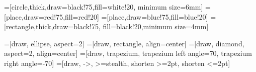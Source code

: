 \usepackage{ifthen}
\usepackage{mathtools} %
\usepackage[usenames,dvipsnames]{color}
\usepackage{listings}
\usepackage{graphicx}
\usepackage{algpseudocode}

\newcommand{\bfc}{{\sc Bfc}}
\newcommand{\mist}{{\sc Mist}}
\newcommand{\iic}{{\sc IIC}}
\newcommand{\pnerf}{{\sc Pnerf}}
\newcommand{\zthree}{{\sc Z3}}

\newcommand{\safety}{{\bf Safety}}
\newcommand{\safetyref}{{\bf Safety by Refinement}}

\newcommand{\ttt}[1]{\texttt{#1}}

\usepackage{tikz}
\usetikzlibrary{arrows,shapes,shapes.multipart,shapes.geometric,
	snakes,automata,backgrounds,petri,calc,positioning}


=[circle,thick,draw=black!75,fill=white!20,
  	minimum size=6mm]
=[place,draw=red!75,fill=red!20]
=[place,draw=blue!75,fill=blue!20]
=[rectangle,thick,draw=black!75,
  	fill=black!20,minimum size=4mm]

=[draw, ellipse, aspect=2]
=[draw, rectangle, align=center]
=[draw, diamond, aspect=2, align=center]
=[draw, trapezium, trapezium left angle=70, trapezium right angle=-70]
=[draw, ->, >=stealth, shorten >=2pt, shorten <=2pt]
